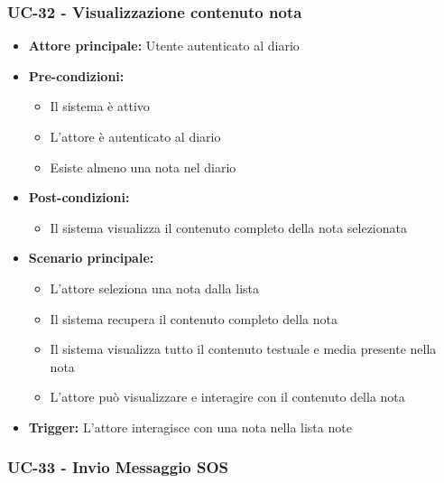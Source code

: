 \documentclass[a4paper,12pt]{article}
\begin{document}
\subsubsection{UC-32 - Visualizzazione contenuto nota} \label{subsec:UC-32}
\begin{itemize}
    \item \textbf{Attore principale:} Utente autenticato al diario
    \item \textbf{Pre-condizioni:}
    \begin{itemize}
        \item Il sistema è attivo
        \item L'attore è autenticato al diario
        \item Esiste almeno una nota nel diario
    \end{itemize}
    \item \textbf{Post-condizioni:} 
    \begin{itemize}
        \item Il sistema visualizza il contenuto completo della nota selezionata
    \end{itemize}
    \item \textbf{Scenario principale:} 
    \begin{itemize}
        \item L'attore seleziona una nota dalla lista
        \item Il sistema recupera il contenuto completo della nota
        \item Il sistema visualizza tutto il contenuto testuale e media presente nella nota
        \item L'attore può visualizzare e interagire con il contenuto della nota
    \end{itemize}
    \item \textbf{Trigger:} L'attore interagisce con una nota nella lista note
\end{itemize}


\subsubsection{UC-33 - Invio Messaggio SOS} \label{sec:UC-33}

\end{document}
